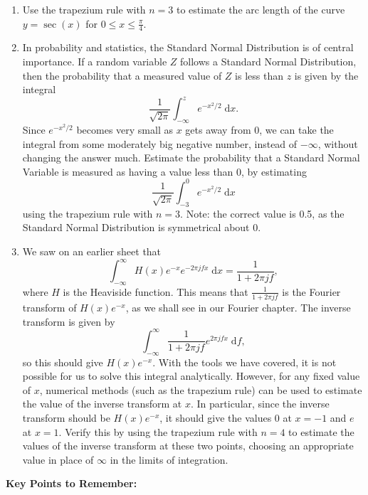 \documentclass{article}
\newcommand{\diff}{\;\mathrm{d}}
\begin{document}
\begin{enumerate}
	\item Use the trapezium rule with $n=3$ to estimate the arc length of the curve $y=\sec(x)$ for $0\leq x\leq \frac{\pi}{4}$.
	\item In probability and statistics, the Standard Normal Distribution is of central importance. If a random variable $Z$ follows a Standard Normal Distribution, then the probability that a measured value of $Z$ is less than $z$ is given by the integral
		\[\frac{1}{\sqrt{2\pi}}\int_{-\infty}^z e^{-x^2/2}\diff x.\]
		Since $e^{-x^2/2}$ becomes very small as $x$ gets away from 0, we can take the integral from some moderately big negative number, instead of $-\infty$, without changing the answer much. Estimate the probability that a Standard Normal Variable is measured as having a value less than 0, by estimating
		\[\frac{1}{\sqrt{2\pi}}\int_{-3}^0 e^{-x^2/2}\diff x\]
		using the trapezium rule with $n=3$. Note: the correct value is 0.5, as the Standard Normal Distribution is symmetrical about $0$.
	\item We saw on an earlier sheet that
		\[\int_{-\infty}^\infty H(x)e^{-x}e^{-2\pi j fx}\diff x = \frac{1}{1+2\pi jf},\]
		where $H$ is the Heaviside function. This means that $\frac{1}{1+2\pi jf}$ is the Fourier transform of $H(x)e^{-x}$, as we shall see in our Fourier chapter. The inverse transform is given by
		\[\int_{-\infty}^\infty \frac{1}{1+2\pi j f}e^{2\pi j fx}\diff f,\]
		so this should give $H(x)e^{-x}$. With the tools we have covered, it is not possible for us to solve this integral analytically. However, for any fixed value of $x$, numerical methods (such as the trapezium rule) can be used to estimate the value of the inverse transform at $x$. In particular, since the inverse transform should be $H(x)e^{-x}$, it should give the values 0 at $x=-1$ and $e$ at $x=1$. Verify this by using the trapezium rule with $n=4$ to estimate the values of the inverse transform at these two points, choosing an appropriate value in place of $\infty$ in the limits of integration.
\end{enumerate}











\clearpage







{\bf Key Points to Remember:}
\end{document}
